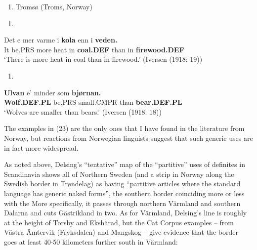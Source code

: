 \begin{enumerate} %
\item 
\label{bkm:Ref135628619}Tromsø (Troms, Norway)

\end{enumerate} %
\setcounter{listLFOxcviiileveli}{0}
\begin{enumerate} %
\item 
\end{enumerate} %
\ea\label{}
\gll Det  e  mer  varme  i  \textbf{kola} enn  i  \textbf{veden.}\\


It  be.PRS  more  heat  in  \textbf{coal.DEF} than  in  \textbf{firewood.DEF}\\ %


‘There is more heat in coal than in firewood.’ (Iversen (1918: 19))
\z

\begin{enumerate} %
\item 
\end{enumerate} %
\ea\label{}
\gll \textbf{Ulvan} e’  minder  som  \textbf{bjørnan.}\\


\textbf{Wolf.DEF.PL} be.PRS  small.CMPR  than  \textbf{bear.DEF.PL}\\ %


‘Wolves are smaller than bears.’ (Iversen (1918: 18))
\z

The examples in (23) are the only ones that I have found in the literature from Norway, but reactions from Norwegian linguists suggest that such generic uses are in fact more widespread. 

As noted above, Delsing’s “tentative” map of the “partitive” uses of definites in Scandinavia shows all of Northern Sweden (and a strip in Norway along the Swedish border in Trøndelag) as having “partitive articles where the standard language has generic naked forms”, the southern border coinciding more or less with the  More specifically, it passes through northern Värmland and southern Dalarna and cuts Gästrikland in two. As for Värmland, Delsing’s line is roughly at the height of Torsby and Ekshärad, but the Cat Corpus examples – from Västra Ämtervik (Fryksdalen) and Mangskog – give evidence that the border goes at least 40-50 kilometers further south in Värmland: 

